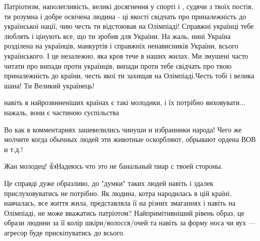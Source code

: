 \begin{itemize}
 

Патріотизм, наполегливість, великі досягнення у спорті і , судячи з твоїх
постів, ти розумна і добре освічена людина - ці якості свідчать про
приналежність до української нації, чию честь ти відстоював на Олімпіаді!
Справжні українці тебе люблять і цінують все, що ти зробив для України. На
жаль, нині Україна розділена на українців, манкуртів і справжніх ненависників
України, всього українського. І це незалежно, яка кров тече в наших жилах. Ми
змушені часто читати про випади проти українців, випади проти тебе свідчать про
твою приналежність до країни, честь якої ти захищав на Олімпіаді.Честь тобі і
велика шана! Ти Великий українець!


 

навіть в найрозвиненіших країнах є такі молодики, і їх потрібно виховувати...
нажаль, вони є частиною суспільства


 

Во как в комментариях зашевелились чинуши и избранники народа! Чего же молчите
когда обычных людей эти животные оскорбляют, обрывают ордена ВОВ и т.д.!

Жан молодец! 👍Надеюсь что это не банальный пиар с твоей стороны.

 

Це справді дуже образливо, до "думки" таких людей навіть і здалек
прислуховуватись не потрібно. Як людина, котра народилась в цій країні,
навчалась, все життя жила, представляла її на різних змаганнях і навіть на
Олімпіаді, не може вважатись патріотом? Найпримітивніший рівень образ, це
образи людини за її колір шкіри/волосся/очей та навіть за форму носа чи вух —
агресор буде прискіпуватись до всього.


\end{itemize}
